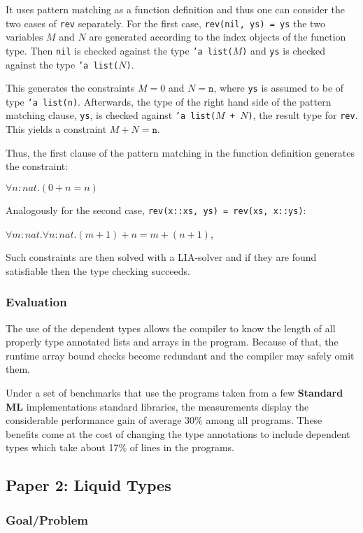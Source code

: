 \documentclass[a4paper,UKenglish]{lipics-v2016}
\begin{document}
It uses pattern matching as a function definition and thus one can consider the
two cases of \texttt{rev} separately. For the first case, \texttt{rev(nil, ys)
= ys} the two variables $M$ and $N$ are generated according to the index
objects of the function type. Then \texttt{nil} is checked against the type
\texttt{'a list($M$)} and \texttt{ys} is checked against the type \texttt{'a
list($N$)}.

This generates the constraints $M = 0$ and $N = \texttt{n}$, where \texttt{ys}
is assumed to be of type \texttt{'a list(n)}. Afterwards, the type of the right
hand side of the pattern matching clause, \texttt{ys}, is checked against
\texttt{'a list($M$ + $N$)}, the result type for \texttt{rev}. This yields a
constraint $M + N = \texttt{n}$.

Thus, the first clause of the pattern matching in the function definition
generates the constraint:

$\forall n : nat. (0 + n = n)$

Analogously for the second case, \texttt{rev(x::xs, ys) = rev(xs, x::ys)}:

$\forall m : nat. \forall n : nat.(m + 1) + n = m + (n + 1)$,

Such constraints are then solved with a LIA-solver and if they are found
satisfiable then the type checking succeeds.

\subsubsection{Evaluation}

The use of the dependent types allows the compiler to know the length of all
properly type annotated lists and arrays in the program. Because of that, the
runtime array bound checks become redundant and the compiler may safely omit
them.

Under a set of benchmarks that use the programs taken from a few
\textbf{Standard ML} implementations standard libraries, the measurements
display the considerable performance gain of average 30\% among all programs.
These benefits come at the cost of changing the type annotations to include
dependent types which take about 17\% of lines in the programs.

\subsection{Paper 2: Liquid Types}

\subsubsection{Goal/Problem}
\end{document}
